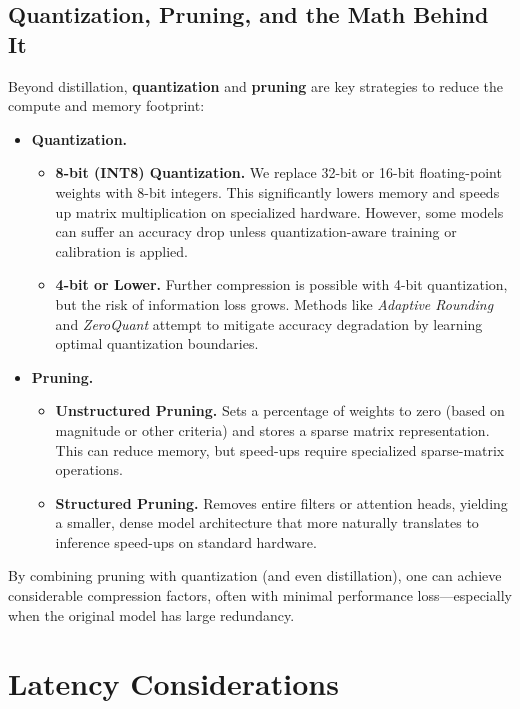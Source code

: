 \subsection{Quantization, Pruning, and the Math Behind It}
\noindent
Beyond distillation, \textbf{quantization} and \textbf{pruning} are key strategies to reduce the compute and memory footprint:

\begin{itemize}
    \item \textbf{Quantization.}
    \begin{itemize}
        \item \textbf{8-bit (INT8) Quantization.} We replace 32-bit or 16-bit floating-point weights with 8-bit integers. This significantly lowers memory and speeds up matrix multiplication on specialized hardware. However, some models can suffer an accuracy drop unless quantization-aware training or calibration is applied.
        \item \textbf{4-bit or Lower.} Further compression is possible with 4-bit quantization, but the risk of information loss grows. Methods like \emph{Adaptive Rounding} and \emph{ZeroQuant} attempt to mitigate accuracy degradation by learning optimal quantization boundaries.
    \end{itemize}

    \item \textbf{Pruning.}
    \begin{itemize}
        \item \textbf{Unstructured Pruning.} Sets a percentage of weights to zero (based on magnitude or other criteria) and stores a sparse matrix representation. This can reduce memory, but speed-ups require specialized sparse-matrix operations.
        \item \textbf{Structured Pruning.} Removes entire filters or attention heads, yielding a smaller, dense model architecture that more naturally translates to inference speed-ups on standard hardware.
    \end{itemize}
\end{itemize}

\noindent
By combining pruning with quantization (and even distillation), one can achieve considerable compression factors, often with minimal performance loss—especially when the original model has large redundancy.

\section{Latency Considerations}
\label{sec:latency_considerations}

